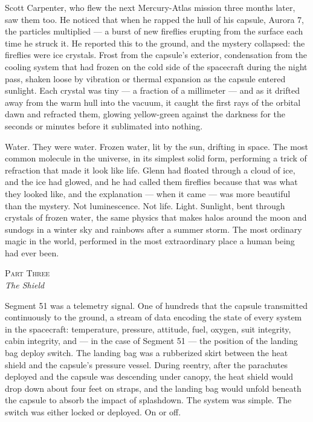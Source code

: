 \documentclass[12pt, letterpaper]{article}
\begin{document}
Scott Carpenter, who flew the next Mercury-Atlas mission three months later, saw them too. He noticed that when he rapped the hull of his capsule, Aurora 7, the particles multiplied --- a burst of new fireflies erupting from the surface each time he struck it. He reported this to the ground, and the mystery collapsed: the fireflies were ice crystals. Frost from the capsule's exterior, condensation from the cooling system that had frozen on the cold side of the spacecraft during the night pass, shaken loose by vibration or thermal expansion as the capsule entered sunlight. Each crystal was tiny --- a fraction of a millimeter --- and as it drifted away from the warm hull into the vacuum, it caught the first rays of the orbital dawn and refracted them, glowing yellow-green against the darkness for the seconds or minutes before it sublimated into nothing.

Water. They were water. Frozen water, lit by the sun, drifting in space. The most common molecule in the universe, in its simplest solid form, performing a trick of refraction that made it look like life. Glenn had floated through a cloud of ice, and the ice had glowed, and he had called them fireflies because that was what they looked like, and the explanation --- when it came --- was more beautiful than the mystery. Not luminescence. Not life. Light. Sunlight, bent through crystals of frozen water, the same physics that makes halos around the moon and sundogs in a winter sky and rainbows after a summer storm. The most ordinary magic in the world, performed in the most extraordinary place a human being had ever been.

\newpage

\begin{center}
{\small\textsc{Part Three}}\\[0.3em]
{\large\textit{The Shield}}
\end{center}

\vspace{1em}

\noindent Segment 51 was a telemetry signal. One of hundreds that the capsule transmitted continuously to the ground, a stream of data encoding the state of every system in the spacecraft: temperature, pressure, attitude, fuel, oxygen, suit integrity, cabin integrity, and --- in the case of Segment 51 --- the position of the landing bag deploy switch. The landing bag was a rubberized skirt between the heat shield and the capsule's pressure vessel. During reentry, after the parachutes deployed and the capsule was descending under canopy, the heat shield would drop down about four feet on straps, and the landing bag would unfold beneath the capsule to absorb the impact of splashdown. The system was simple. The switch was either locked or deployed. On or off.
\end{document}
